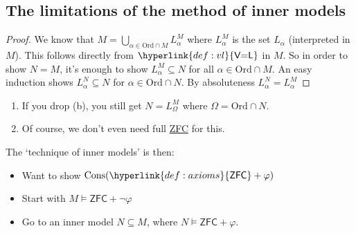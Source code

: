 \documentclass{article}
\newcommand{\named}[1]{\textbf{#1}\index{#1}}
\newcommand{\1}{\mathbbm{1}}
\DeclareMathOperator{\cons}{Cons}
\let\models\vDash
\begin{document}
\subsection{The limitations of the method of inner models}
\begin{proof}
  We know that $M = \bigcup_{\alpha \in \text{Ord} \cap M} L_\alpha^{M}$ where $L_\alpha^M$ is the set $L_\alpha$ (interpreted in $M$).
  This follows directly from $\hyperlink{def:vl}{\textsf{V=L}}$ in $M$.
  So in order to show $N=M$, it's enough to show $L_\alpha^M \subseteq N$ for all $\alpha \in \text{Ord} \cap M$.
  An easy induction shows $L_\alpha^N \subseteq N$ for $\alpha \in \text{Ord} \cap N$. By absoluteness $L_\alpha^N = L_\alpha^M$
\end{proof}
\begin{remark}\leavevmode
  \begin{enumerate}
    \item If you drop (b), you still get $N = L_\Omega^M$ where $\Omega = \text{Ord} \cap N$.
    \item Of course, we don't even need full \hyperlink{def:axioms}{\textsf{ZFC}} for this.
  \end{enumerate}
\end{remark}
The `technique of inner models' is then:
\begin{itemize}
  \item Want to show $\cons(\hyperlink{def:axioms}{\textsf{ZFC}}+\varphi)$
  \item Start with $M \models \textsf{ZFC} + \neg \varphi$
  \item Go to an inner model $N \subseteq M$, where $N \models \textsf{ZFC} +\varphi$.
\end{itemize}
\end{document}
